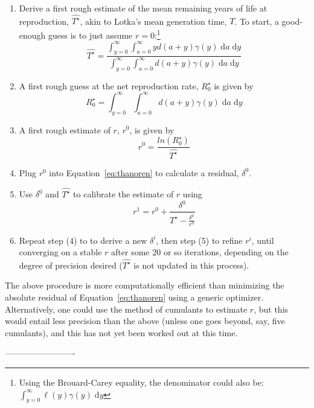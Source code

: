 \documentclass{article}
\newcommand{\dd}{\; \mathrm{d}}
\begin{document}
\begin{appendices}
\begin{enumerate}
  \item Derive a first rough estimate of the mean remaining years of life at
  reproduction, $\widehat{T^\star}$, akin to Lotka's mean generation time, $T$.
  To start, a good-enough guess is to just assume $r=0$:\footnote{Using the
  Brouard-Carey equality, the denominator could also be: $\int _{y=0}^\infty
  \ell(y) \gamma(y) \dd y$}
\begin{equation}
\widehat{T^\star} = \frac{\int _{y=0}^\infty \int _{a=0}^\infty y d (a+y)
\gamma(y) \dd a \dd y}{\int _{y=0}^\infty \int _{a=0}^\infty d(a+y) \gamma(y)
\dd a \dd y}
\end{equation}
  \item A first rough guess at the net reproduction rate, $R_0^\star$ is given
  by
 \begin{equation}
  R_0^\star = \int _{y=0}^\infty \int _{a=0}^\infty d(a+y) \gamma(y) \dd a
\dd y
\end{equation}
  \item A first rough estimate of $r$, $r^0$, is given by
   \begin{equation}
   r^0 = \frac{ln(R_0^\star)}{\widehat{T^\star}}
   \end{equation}
  \item Plug $r^0$ into Equation~\eqref{eq:thanoren} to calculate a
  residual, $\delta^0$.
  \item Use $\delta^0$ and $\widehat{T^\star}$ to calibrate the estimate of $r$
  using
  \begin{equation}
  r^{1} = r^0 + \frac{\delta^0}{\widehat{T^\star} - \frac{\delta^0}{r^0}}
  \end{equation}
  \item Repeat step (4) to to derive a new $\delta^i$, then step (5) to refine
  $r^i$, until converging on a stable $r$ after some 20 or so iterations,
  depending on the degree of precision desired ($\widehat{T^\star}$ is not updated
  in this process).
\end{enumerate}

The above procedure is more computationally efficient than minimizing the
absolute residual of Equation~\eqref{eq:thanoren} using a generic
optimizer. Alternatively, one could use the method of cumulants to estimate $r$,
but this would entail less precision than the above (unless one goes beyond,
say, five cumulants), and this has not yet been worked out at this time.
 
\end{appendices}
\nocite{HMD,HFD}
-------------------------

    
\end{document}
